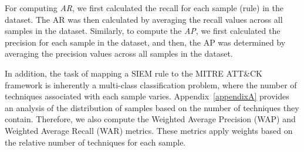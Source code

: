 For computing \textit{AR}, we first calculated the recall for each sample (rule) in the dataset. 
The AR was then calculated by averaging the recall values across all samples in the dataset.
Similarly, to compute the \textit{AP}, we first calculated the precision for each sample in the dataset, and then, the AP was determined by averaging the precision values across all samples in the dataset.


In addition, the task of mapping a SIEM rule to the MITRE ATT\&CK framework is inherently a multi-class classification problem, where the number of techniques associated with each sample varies. 
Appendix~\ref{appendixA} provides an analysis of the distribution of samples based on the number of techniques they contain. 
Therefore, we also compute the Weighted Average Precision (WAP) and Weighted Average Recall (WAR) metrics. 
These metrics apply weights based on the relative number of techniques for each sample. 